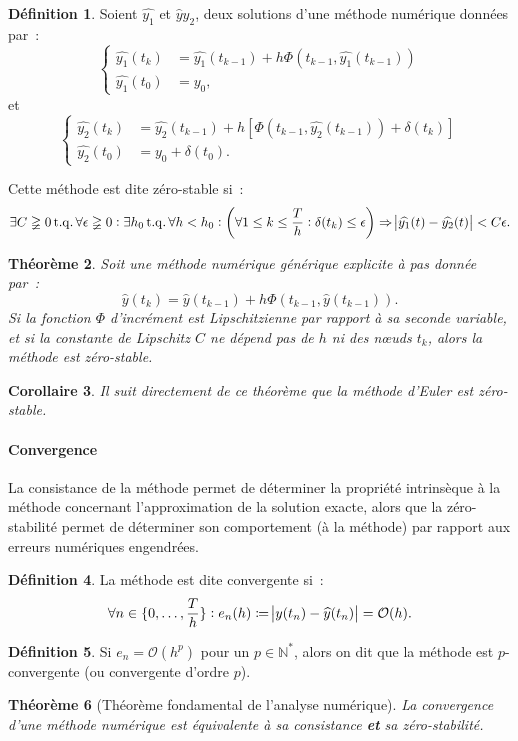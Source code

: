 \documentclass{article}
\newtheorem{thm}{Théorème}[section]
\newtheorem{cor}[thm]{Corollaire}
\theoremstyle{definition}
\newtheorem{déf}[thm]{Définition}
\theoremstyle{remark}
\DeclareMathOperator{\tq}{t.q.}  %
\newcommand{\N}{\mathbb N}
\begin{document}
		\begin{déf} Soient $\widehat {y_1}$ et $\widehat y{y_2}$, deux solutions d'une méthode numérique données par~:
		\[\begin{cases}\widehat {y_1}
			(t_k) &= \widehat {y_1}(t_{k-1}) + h\Phi(t_{k-1}, \widehat {y_1}(t_{k-1})) \\
			\widehat {y_1}(t_0) &= y_0,
		\end{cases}\]
		et
		\[\begin{cases}
			\widehat {y_2}(t_k) &= \widehat {y_2}(t_{k-1}) + h\left[\Phi(t_{k-1}, \widehat {y_2}(t_{k-1})) + \delta(t_k)\right] \\
			\widehat {y_2}(t_0) &= y_0 + \delta(t_0).
		\end{cases}\]

		Cette méthode est dite zéro-stable si~:
		\[\exists C \gneqq 0 \tq \forall \epsilon \gneqq 0 : \exists h_0 \tq \forall h < h_0 :
			\left(\forall 1 \leq k \leq \frac Th : \delta(t_k) \leq \epsilon\right) \Rightarrow \abs {\widehat {y_1}(t) - \widehat {y_2}(t)} < C\epsilon.\]
		\end{déf}

		\begin{thm} Soit une méthode numérique générique explicite à pas donnée par~:
		\[\widehat y(t_k) = \widehat y(t_{k-1}) + h\Phi(t_{k-1}, \widehat y(t_{k-1})).\]
		Si la fonction $\Phi$ d'incrément est Lipschitzienne par rapport à sa seconde variable, et si la constante de Lipschitz $C$ ne dépend pas de $h$ ni des
		nœuds $t_k$, alors la méthode est zéro-stable.
		\end{thm}

		\begin{cor} Il suit directement de ce théorème que la méthode d'Euler est zéro-stable. \end{cor}

		\paragraph{Convergence} La consistance de la méthode permet de déterminer la propriété intrinsèque à la méthode concernant l'approximation de la
		solution exacte, alors que la zéro-stabilité permet de déterminer son comportement (à la méthode) par rapport aux erreurs numériques engendrées.

		\begin{déf} La méthode est dite convergente si~:
		\[\forall n \in \{0, \dotsc, \frac Th\} : e_n(h) \coloneqq \abs{y(t_n) - \widehat y(t_n)} = \mathcal O(h).\]
		\end{déf}

		\begin{déf} Si $e_n = \mathcal O(h^p)$ pour un $p \in \N^*$, alors on dit que la méthode est $p$-convergente (ou convergente d'ordre $p$). \end{déf}

		\begin{thm}[Théorème fondamental de l'analyse numérique] La convergence d'une méthode numérique est équivalente à sa consistance \textbf{et} sa
		zéro-stabilité.
		\end{thm}
\end{document}
